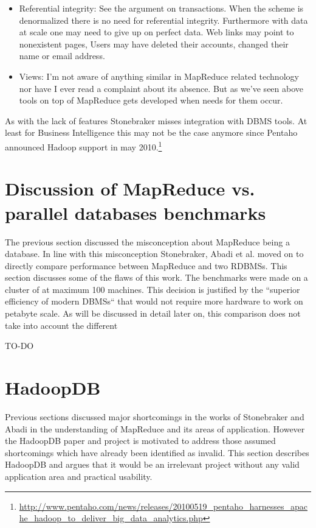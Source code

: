\documentclass[12pt,a4paper]{scrartcl}		%
\begin{document}
\begin{itemize}
\item Referential integrity: See the argument on transactions. When the scheme is denormalized there is no need for referential integrity. Furthermore with data at scale one may need to give up on perfect data. Web links may point to nonexistent pages, Users may have deleted their accounts, changed their name or email address.
\item Views: I'm not aware of anything similar in MapReduce related technology nor have I ever read a complaint about its absence. But as we've seen above tools on top of MapReduce gets developed when needs for them occur.
\end{itemize}
As with the lack of features Stonebraker misses integration with DBMS tools. At least for Business Intelligence this may not be the case anymore since Pentaho announced Hadoop support in may 2010.\footnote{\url{http://www.pentaho.com/news/releases/20100519_pentaho_harnesses_apache_hadoop_to_deliver_big_data_analytics.php}}

\section{Discussion of MapReduce vs. parallel databases benchmarks}
The previous section discussed the misconception about MapReduce being a database. In line with this misconception Stonebraker, Abadi et al. moved on to directly compare performance between MapReduce and two RDBMSs.\cite{Pavlo09} This section discusses some of the flaws of this work.
The benchmarks were made on a cluster of at maximum 100 machines. This decision is justified by the ``superior efficiency of modern DBMSs`` that would not require more hardware to work on petabyte scale. As will be discussed in detail later on, this comparison does not take into account the different 

TO-DO

\section{HadoopDB}
Previous sections discussed major shortcomings in the works of Stonebraker and Abadi in the understanding of MapReduce and its areas of application. However the HadoopDB paper and project is motivated to address those assumed shortcomings which have already been identified as invalid.
This section describes HadoopDB and argues that it would be an irrelevant project without any valid application area and practical usability.
\end{document}
